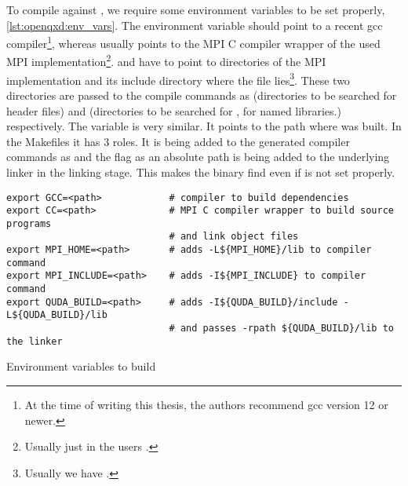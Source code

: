 To compile \openqxd against \quda, we require some environment variables to be set properly, \cref{lst:openqxd:env_vars}.
The environment variable  should point to a recent gcc compiler\footnote{At the time of writing this thesis, the authors recommend gcc version 12 or newer.}, whereas  usually points to the MPI C compiler wrapper of the used MPI implementation\footnote{Usually just  in the users .}.
 and  have to point to directories of the MPI implementation and its include directory where the file  lies\footnote{Usually we have .}.
These two directories are passed to the compile commands as  (directories to be searched for header files) and  (directories to be searched for , \ie for named libraries.) respectively.
The variable  is very similar.
It points to the path where \quda was built.
In the Makefiles it has 3 roles.
It is being added to the generated compiler commands as  and the flag  as an absolute path is being added to the underlying linker in the linking stage.
This makes the binary find  even if  is not set properly.
\begin{codelisting}
\begin{verbatim}
export GCC=<path>            # compiler to build dependencies
export CC=<path>             # MPI C compiler wrapper to build source programs
                             # and link object files
export MPI_HOME=<path>       # adds -L${MPI_HOME}/lib to compiler command
export MPI_INCLUDE=<path>    # adds -I${MPI_INCLUDE} to compiler command
export QUDA_BUILD=<path>     # adds -I${QUDA_BUILD}/include -L${QUDA_BUILD}/lib
                             # and passes -rpath ${QUDA_BUILD}/lib to the linker
\end{verbatim}
\caption{Environment variables to build \openqxd}
\label{lst:openqxd:env_vars}
\end{codelisting}



